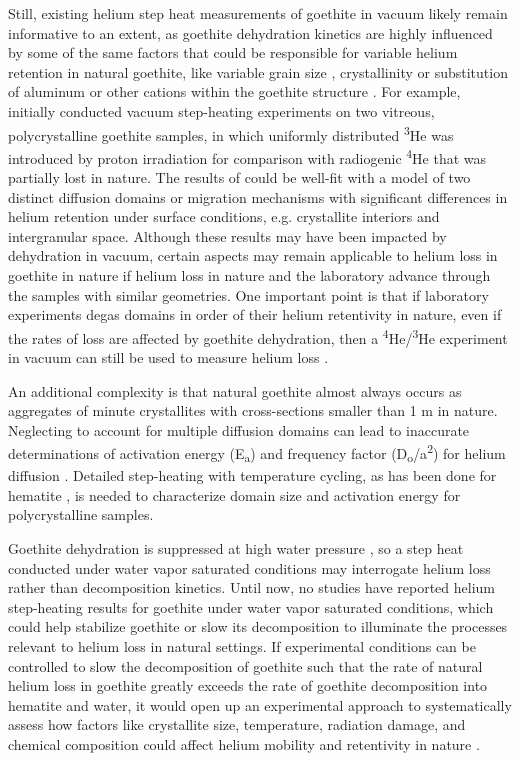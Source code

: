 Still, existing helium step heat measurements of goethite in vacuum
likely remain informative to an extent, as goethite dehydration kinetics
are highly influenced by some of the same factors that could be
responsible for variable helium retention in natural goethite, like
variable grain size \citep{navrotsky2008,guobarnard2011,goss1987}, crystallinity \citep{schwertmann1985} or substitution of
aluminum or other cations within the goethite structure \citep{majzlan2003,bassal2022}. For example, \citet{shustervasconcelos2005} initially
conducted vacuum step-heating experiments on two vitreous,
polycrystalline goethite samples, in which uniformly distributed \textsuperscript{3}He was
introduced by proton irradiation for comparison with radiogenic \textsuperscript{4}He that
was partially lost in nature. The results of \citet{shustervasconcelos2005} could
be well-fit with a model of two distinct diffusion domains or migration
mechanisms with significant differences in helium retention under
surface conditions, e.g. crystallite interiors and intergranular space.
Although these results may have been impacted by dehydration in vacuum,
certain aspects may remain applicable to helium loss in goethite in
nature if helium loss in nature and the laboratory advance through the
samples with similar geometries. One important point is that if
laboratory experiments degas domains in order of their helium
retentivity in nature, even if the rates of loss are affected by
goethite dehydration, then a \textsuperscript{4}He/\textsuperscript{3}He
experiment in vacuum can still be used to measure helium loss \citep{shustervasconcelos2005,vasconcelos2013}.

An additional complexity is that natural goethite almost always occurs
as aggregates of minute crystallites with cross-sections smaller than 1
\textmu m in nature. Neglecting to account for multiple diffusion domains can
lead to inaccurate determinations of activation energy
(E\textsubscript{a}) and frequency factor
(D\textsubscript{o}/a\textsuperscript{2}) for helium diffusion \citep{farley2018}. Detailed step-heating with temperature cycling, as has been done
for hematite \citep{farleyflowers2012,farley2018}, is needed to
characterize domain size and activation energy for polycrystalline
samples.

Goethite dehydration is suppressed at high water pressure \citep{langmuir1971,navrotsky2008}, so a step heat conducted under water vapor saturated conditions may interrogate helium loss
rather than decomposition kinetics. Until now, no studies have reported
helium step-heating results for goethite under water vapor saturated conditions, which could help stabilize goethite or
slow its decomposition to illuminate the processes relevant to helium loss
in natural settings. If
experimental conditions can be controlled to slow the decomposition of
goethite such that the rate of natural helium loss in goethite greatly
exceeds the rate of goethite decomposition into hematite and water, it
would open up an experimental approach to systematically assess how
factors like crystallite size, temperature, radiation damage, and
chemical composition could affect helium mobility and retentivity in
nature \citep{bassal2022}.

